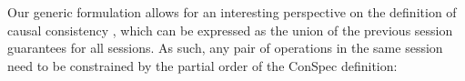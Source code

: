\documentclass[journal,compsoc]{IEEEtran}
\begin{document}

Our generic formulation allows for an interesting perspective on the definition of causal consistency \cite{Ahamad:1993:PPC:165231.165264}, which can be expressed as the union of the previous session guarantees for all sessions. As such, any pair of operations in the same session need to be constrained by the partial order of the ConSpec definition:
\end{document}
